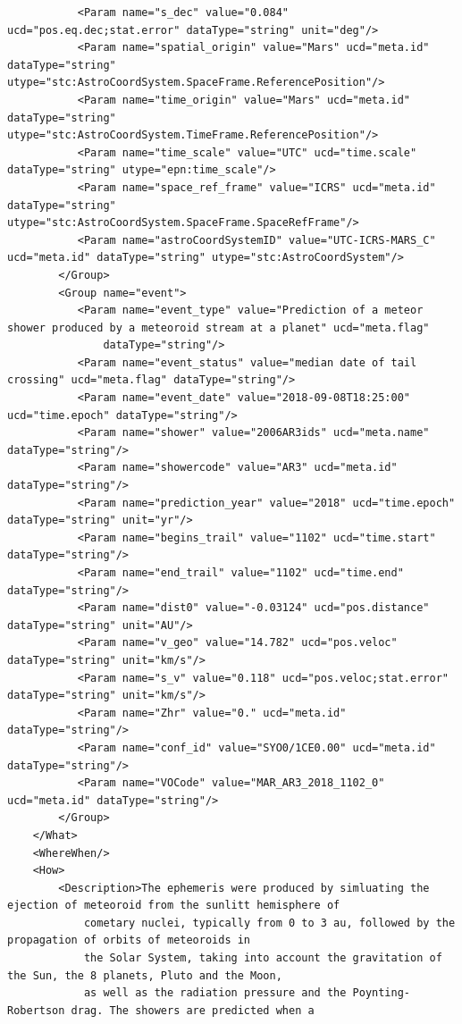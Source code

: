 \documentclass[referee,a4paper,12pt,traditabstract]{swsc}
\begin{document}
\begin{linenumbers}
{\begin{verbatim}
           <Param name="s_dec" value="0.084" ucd="pos.eq.dec;stat.error" dataType="string" unit="deg"/>
           <Param name="spatial_origin" value="Mars" ucd="meta.id" dataType="string" utype="stc:AstroCoordSystem.SpaceFrame.ReferencePosition"/>
           <Param name="time_origin" value="Mars" ucd="meta.id" dataType="string" utype="stc:AstroCoordSystem.TimeFrame.ReferencePosition"/>
           <Param name="time_scale" value="UTC" ucd="time.scale" dataType="string" utype="epn:time_scale"/>
           <Param name="space_ref_frame" value="ICRS" ucd="meta.id" dataType="string" utype="stc:AstroCoordSystem.SpaceFrame.SpaceRefFrame"/>
           <Param name="astroCoordSystemID" value="UTC-ICRS-MARS_C" ucd="meta.id" dataType="string" utype="stc:AstroCoordSystem"/>
        </Group>
        <Group name="event">
           <Param name="event_type" value="Prediction of a meteor shower produced by a meteoroid stream at a planet" ucd="meta.flag" 
               dataType="string"/>
           <Param name="event_status" value="median date of tail crossing" ucd="meta.flag" dataType="string"/>
           <Param name="event_date" value="2018-09-08T18:25:00" ucd="time.epoch" dataType="string"/>
           <Param name="shower" value="2006AR3ids" ucd="meta.name" dataType="string"/>
           <Param name="showercode" value="AR3" ucd="meta.id" dataType="string"/>
           <Param name="prediction_year" value="2018" ucd="time.epoch" dataType="string" unit="yr"/>
           <Param name="begins_trail" value="1102" ucd="time.start" dataType="string"/>
           <Param name="end_trail" value="1102" ucd="time.end" dataType="string"/>
           <Param name="dist0" value="-0.03124" ucd="pos.distance" dataType="string" unit="AU"/>
           <Param name="v_geo" value="14.782" ucd="pos.veloc" dataType="string" unit="km/s"/>
           <Param name="s_v" value="0.118" ucd="pos.veloc;stat.error" dataType="string" unit="km/s"/>
           <Param name="Zhr" value="0." ucd="meta.id" dataType="string"/>
           <Param name="conf_id" value="SYO0/1CE0.00" ucd="meta.id" dataType="string"/>
           <Param name="VOCode" value="MAR_AR3_2018_1102_0" ucd="meta.id" dataType="string"/>
        </Group>
    </What>
    <WhereWhen/>
    <How>
        <Description>The ephemeris were produced by simluating the ejection of meteoroid from the sunlitt hemisphere of 
            cometary nuclei, typically from 0 to 3 au, followed by the propagation of orbits of meteoroids in 
            the Solar System, taking into account the gravitation of the Sun, the 8 planets, Pluto and the Moon, 
            as well as the radiation pressure and the Poynting-Robertson drag. The showers are predicted when a 

\end{verbatim}}
\end{linenumbers}
\end{document}
